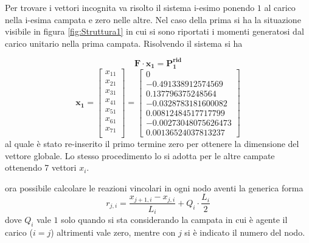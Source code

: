 Per trovare i vettori incognita va risolto il sistema i-esimo ponendo $1$ al carico nella i-esima campata e zero nelle altre.
Nel caso della prima si ha la situazione visibile in figura \ref{fig:Struttura1} in cui si sono riportati i momenti generatosi dal carico unitario nella prima campata. 
Risolvendo il sistema si ha 

\begin{equation}
\mathbf{F\cdot x_1 = P^{rid}_{1}}
\end{equation}
\begin{equation}
\mathbf{x_1}=
\begin{bmatrix}
x_{11}\\
x_{21}\\
x_{31}\\
x_{41}\\
x_{51}\\
x_{61}\\
x_{71}\\
\end{bmatrix} =
\begin{bmatrix}
0\\
-0.491338912574569 \\
0.137796375248564 \\
-0.0328783181600082 \\
0.00812484517717799 \\
-0.00273048075626473 \\
0.00136524037813237
\end{bmatrix}
\end{equation} 
al quale è stato re-inserito il primo termine zero per ottenere la dimensione del vettore globale.
Lo stesso procedimento lo si adotta per le altre campate ottenendo 7 vettori $x_i$.

\e ora possibile calcolare le reazioni vincolari in ogni nodo aventi la generica forma
\begin{equation}
r_{j,i}=\frac{x_{j+1,i}-x_{j,i}}{L_i}+Q_i\cdot\frac{L_i}{2}
\end{equation} dove $Q_i$ vale $1$ solo quando si sta considerando la campata in cui è agente il carico ($i=j$) altrimenti vale zero, mentre con $j$ si è indicato il numero del nodo.


